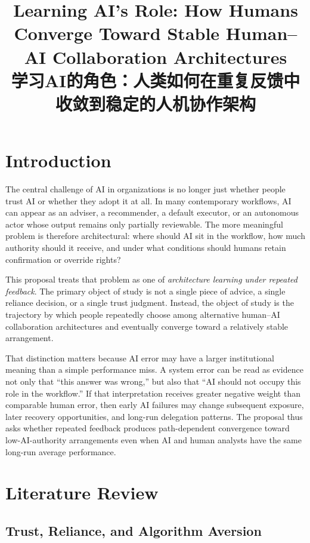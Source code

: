 \documentclass[man,natbib]{apa7}
\title{Learning AI's Role: How Humans Converge Toward Stable Human--AI Collaboration Architectures\\学习AI的角色：人类如何在重复反馈中收敛到稳定的人机协作架构}
\begin{document}
\maketitle

\section{Introduction}

The central challenge of AI in organizations is no longer just whether people trust AI or whether they adopt it at all. In many contemporary workflows, AI can appear as an adviser, a recommender, a default executor, or an autonomous actor whose output remains only partially reviewable. The more meaningful problem is therefore architectural: where should AI sit in the workflow, how much authority should it receive, and under what conditions should humans retain confirmation or override rights?

This proposal treats that problem as one of \textit{architecture learning under repeated feedback}. The primary object of study is not a single piece of advice, a single reliance decision, or a single trust judgment. Instead, the object of study is the trajectory by which people repeatedly choose among alternative human--AI collaboration architectures and eventually converge toward a relatively stable arrangement.

That distinction matters because AI error may have a larger institutional meaning than a simple performance miss. A system error can be read as evidence not only that ``this answer was wrong,'' but also that ``AI should not occupy this role in the workflow.'' If that interpretation receives greater negative weight than comparable human error, then early AI failures may change subsequent exposure, later recovery opportunities, and long-run delegation patterns. The proposal thus asks whether repeated feedback produces path-dependent convergence toward low-AI-authority arrangements even when AI and human analysts have the same long-run average performance.

\section{Literature Review}

\subsection{Trust, Reliance, and Algorithm Aversion}
\end{document}
